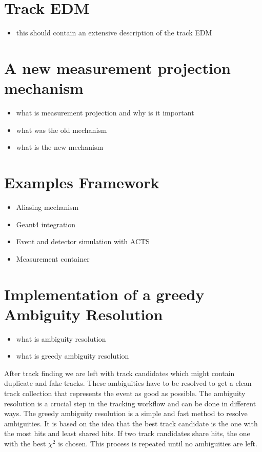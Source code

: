 \section{Track EDM}

\begin{itemize}
    \color{red}
    \item this should contain an extensive description of the track EDM
\end{itemize}

\section{A new measurement projection mechanism}

\begin{itemize}
    \color{red}
    \item what is measurement projection and why is it important
    \item what was the old mechanism
    \item what is the new mechanism
\end{itemize}

\section{Examples Framework}

\begin{itemize}
    \color{red}
    \item Aliasing mechanism
    \item Geant4 integration
    \item Event and detector simulation with ACTS
    \item Measurement container
\end{itemize}

\section{Implementation of a greedy Ambiguity Resolution}

\begin{itemize}
    \color{red}
    \item what is ambiguity resolution
    \item what is greedy ambiguity resolution
\end{itemize}

After track finding we are left with track candidates which might contain duplicate and fake tracks. These ambiguities have to be resolved to get a clean track collection that represents the event as good as possible. The ambiguity resolution is a crucial step in the tracking workflow and can be done in different ways. The greedy ambiguity resolution is a simple and fast method to resolve ambiguities. It is based on the idea that the best track candidate is the one with the most hits and least shared hits. If two track candidates share hits, the one with the best $\chi^2$ is chosen. This process is repeated until no ambiguities are left.

